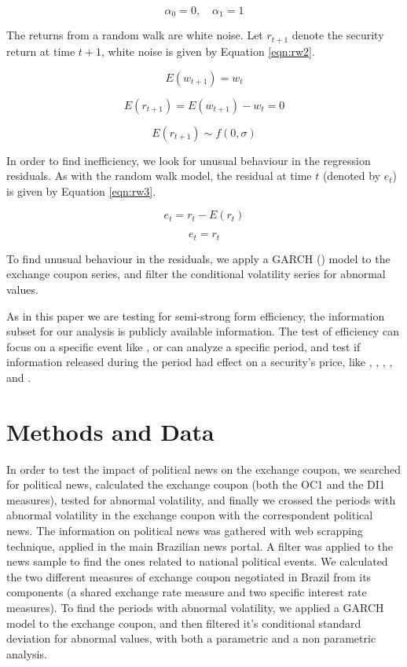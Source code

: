 \documentclass[cic,tc, english]{iiufrgs}
\begin{document}
    $$\alpha_0 = 0, \quad \alpha_1 = 1$$

    The returns from a random walk are white noise. Let $r_{t+1}$ denote the security return at time $t+1$, white noise is given by Equation \ref{eqn:rw2}.
    
    $$E(w_{t+1}) = w_t$$
    
    $$E(r_{t+1}) = E(w_{t+1}) - w_t = 0$$
    
    \begin{equation}
        \label{eqn:rw2}
        E(r_{t+1}) \sim f(0, \sigma)
    \end{equation}

    In order to find inefficiency, we look for unusual behaviour in the regression residuals. As with the random walk model, the residual at time $t$ (denoted by $e_t$) is given by Equation \ref{eqn:rw3}.

    $$e_t = r_t - E(r_t)$$

    \begin{equation}
        \label{eqn:rw3}
        e_t = r_t
    \end{equation}

    To find unusual behaviour in the residuals, we apply a GARCH (\citet{bollerslev1986}) model to the exchange coupon series, and filter the conditional volatility series for abnormal values.
    
    As in this paper we are testing for semi-strong form efficiency, the information subset for our analysis is publicly available information. The test of efficiency can focus on a specific event like \citet{gabrielribeiro2013}, or can analyze a specific period, and test if information released during the period had effect on a security's price, like \citet{caporaleetal2015}, \citet{macqueenroley1993}, \citet{larsenthorsrud2017}, \citet{moussaetal2017}, \citet{smales2015} and \citet{marquessantos2016}.


\chapter{Methods and Data} \label{chapter_methods_data}

    In order to test the impact of political news on the exchange coupon, we searched for political news, calculated the exchange coupon (both the OC1 and the DI1 measures), tested for abnormal volatility, and finally we crossed the periods with abnormal volatility in the exchange coupon with the correspondent political news. The information on political news was gathered with web scrapping technique, applied in the main Brazilian news portal. A filter was applied to the news sample to find the ones related to national political events. We calculated the two different measures of exchange coupon negotiated in Brazil from its components (a shared exchange rate measure and two specific interest rate measures). To find the periods with abnormal volatility, we applied a GARCH model to the exchange coupon, and then filtered it's conditional standard deviation for abnormal values, with both a parametric and a non parametric analysis.
\end{document}
